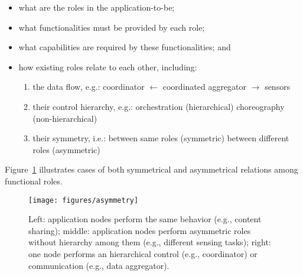 \begin{itemize}
	
	\item what are the roles in the application-to-be;
	
	\item what functionalities must be provided by each role;
	
	\item what capabilities are required by these functionalities; and
	
	
	\item how existing roles relate to each other, including: 
	
	\begin{enumerate}[label=-]
		
		\item the data flow, e.g.:
			\subitem coordinator $\leftarrow$ coordinated 
			\subitem aggregator  $\rightarrow$ sensors 
	
		\item their control hierarchy, e.g.:%
			\subitem orchestration (hierarchical)
			\subitem choreography (non-hierarchical)
	
		\item their symmetry, i.e.:
			\subitem between same roles (symmetric) 
			\subitem between different roles (asymmetric)
		
	\end{enumerate}	
	
\end{itemize}

Figure~\ref{fig:asymmetry} illustrates cases of both symmetrical and asymmetrical relations among functional roles. 

\begin{figure}[t!]
	\centering
	\texttt{[image: figures/asymmetry]}
	\caption{Left: application nodes perform the same behavior (e.g., content sharing); middle: application nodes perform asymmetric roles without hierarchy among them (e.g., different sensing tasks); right: one node performs an hierarchical control (e.g., coordinator) or communication (e.g., data aggregator).}
	\label{fig:asymmetry}
\end{figure}


